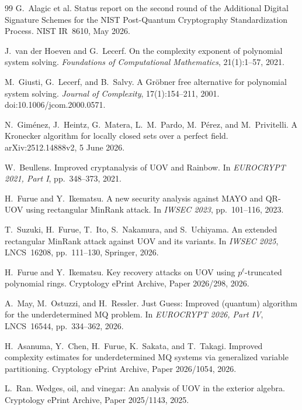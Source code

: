 \documentclass[11pt,a4paper]{article}
\theoremstyle{definition}
\theoremstyle{remark}
\begin{document}
\begin{thebibliography}{99}
G.~Alagic et al.
\newblock Status report on the second round of the Additional Digital Signature Schemes for the NIST Post-Quantum Cryptography Standardization Process.
\newblock NIST IR~8610, May 2026.

J.~van der Hoeven and G.~Lecerf.
\newblock On the complexity exponent of polynomial system solving.
\newblock \emph{Foundations of Computational Mathematics}, 21(1):1--57, 2021.

M.~Giusti, G.~Lecerf, and B.~Salvy.
\newblock A Gr\"obner free alternative for polynomial system solving.
\newblock \emph{Journal of Complexity}, 17(1):154--211, 2001.
\newblock doi:10.1006/jcom.2000.0571.

N.~Gim\'enez, J.~Heintz, G.~Matera, L.~M.~Pardo, M.~P\'erez, and M.~Privitelli.
\newblock A Kronecker algorithm for locally closed sets over a perfect field.
\newblock arXiv:2512.14888v2, 5 June 2026.

W.~Beullens.
\newblock Improved cryptanalysis of UOV and Rainbow.
\newblock In \emph{EUROCRYPT 2021, Part I}, pp.~348--373, 2021.

H.~Furue and Y.~Ikematsu.
\newblock A new security analysis against MAYO and QR-UOV using rectangular MinRank attack.
\newblock In \emph{IWSEC 2023}, pp.~101--116, 2023.

T.~Suzuki, H.~Furue, T.~Ito, S.~Nakamura, and S.~Uchiyama.
\newblock An extended rectangular MinRank attack against UOV and its variants.
\newblock In \emph{IWSEC 2025}, LNCS~16208, pp.~111--130, Springer, 2026.

H.~Furue and Y.~Ikematsu.
\newblock Key recovery attacks on UOV using $p^\ell$-truncated polynomial rings.
\newblock Cryptology ePrint Archive, Paper 2026/298, 2026.

A.~May, M.~Ostuzzi, and H.~Ressler.
\newblock Just Guess: Improved (quantum) algorithm for the underdetermined MQ problem.
\newblock In \emph{EUROCRYPT 2026, Part IV}, LNCS~16544, pp.~334--362, 2026.

H.~Asanuma, Y.~Chen, H.~Furue, K.~Sakata, and T.~Takagi.
\newblock Improved complexity estimates for underdetermined MQ systems via generalized variable partitioning.
\newblock Cryptology ePrint Archive, Paper 2026/1054, 2026.

L.~Ran.
\newblock Wedges, oil, and vinegar: An analysis of UOV in the exterior algebra.
\newblock Cryptology ePrint Archive, Paper 2025/1143, 2025.


\end{thebibliography}
\end{document}
